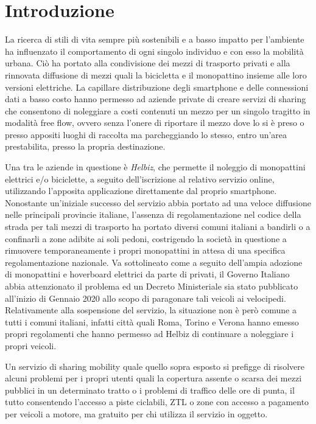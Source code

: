 \chapter{Introduzione}

La ricerca di stili di vita sempre più sostenibili e a basso impatto per
l'ambiente ha influenzato il comportamento di ogni singolo individuo e con esso
la mobilità urbana.
Ciò ha portato alla condivisione dei mezzi di trasporto privati e alla rinnovata
diffusione di mezzi quali la bicicletta e il monopattino insieme alle loro versioni
elettriche.
La capillare distribuzione degli smartphone e delle connessioni dati a basso costo
hanno permesso ad aziende private di creare servizi di sharing che consentono di 
noleggiare a costi contenuti un mezzo per un singolo tragitto in modalità free flow, ovvero
senza l'onere di riportare il mezzo dove lo si è preso o presso appositi luoghi
di raccolta ma parcheggiando lo stesso, entro un'area prestabilita, presso la
propria destinazione.

Una tra le aziende in questione è \emph{Helbiz}, che permette il noleggio di monopattini
elettrici e/o biciclette, a seguito dell'iscrizione al relativo servizio online,
utilizzando l'apposita applicazione direttamente dal proprio smartphone. Nonostante un'iniziale
successo del servizio abbia portato ad una veloce diffusione nelle principali provincie
italiane, l'assenza di regolamentazione nel codice della strada per tali mezzi di
trasporto ha portato diversi comuni italiani a bandirli o a confinarli a zone adibite
ai soli pedoni, costrigendo la società in questione a rimuovere temporaneamente i
propri monopattini in attesa di una specifica regolamentazione nazionale.
Va sottolineato come a seguito dell'ampia adozione di monopattini e hoverboard
elettrici da parte di privati, il Governo Italiano abbia attenzionato il problema
ed un Decreto Ministeriale sia stato pubblicato all'inizio di Gennaio 2020 allo
scopo di paragonare tali veicoli ai velocipedi.
Relativamente alla sospensione del servizio, la situazione non
è però comune a tutti i comuni italiani, infatti città quali Roma, Torino e Verona
hanno emesso propri regolamenti che hanno permesso ad Helbiz di continuare a
noleggiare i propri veicoli.

Un servizio di sharing mobility quale quello sopra esposto si prefigge di risolvere
alcuni problemi per i propri utenti quali la copertura assente o scarsa dei mezzi
pubblici in un determinato tratto o i problemi di traffico delle ore di punta, il tutto
consentendo l'accesso a piste ciclabili, ZTL o zone con accesso a pagamento per veicoli
a motore, ma gratuito per chi utilizza il servizio in oggetto.

